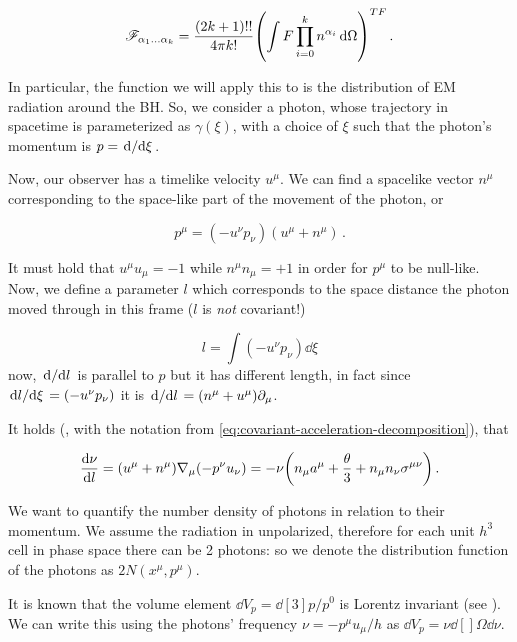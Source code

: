 \documentclass[main.tex]{subfiles}
\begin{document}
\begin{equation} \label{eq:PSTF-moments-function-decomposition}
    \mathscr F_{\alpha_1 \dots \alpha_k} =
    \frac{(2k+1)!!}{4 \pi k!} \qty(\int F \prod_{i=0}^k n^{\alpha_i}  \dd{\Omega}  )^{TF} \,.
\end{equation}

In particular, the function we will apply this to is the distribution of EM radiation around the BH. So, we consider a photon, whose trajectory in spacetime is parameterized as \(\gamma(\xi)\), with a choice of \(\xi\) such that the photon's momentum is
\(
p = \dv*{}{\xi}
\).

Now, our observer has a timelike velocity \(u^\mu\). We can find a spacelike vector \(n^\mu\) corresponding to the space-like part of the movement of the photon, or

\begin{equation}
  p^\mu = (- u^\nu p_\nu) (u^\mu + n^\mu)\,.
\end{equation}

It must hold that \(u^\mu u_\mu = -1 \) while \(n^\mu n_\mu = +1 \) in order for \(p^\mu\) to be null-like.
Now, we define a parameter \(l\) which corresponds to the space distance the photon moved through in this frame (\(l\)  is \emph{not} covariant!)

\begin{equation}
    l = \int  (-u^\nu p_\nu) \dd{\xi}
\end{equation}
now, \(\dv*{}{l} \) is parallel to \(p\) but it has different length, in fact since \(\dv*{l}{\xi} = (-u^\nu p_\nu) \) it is \(\dv*{}{l} = (n^\mu + u^\mu) \partial_\mu\).

It holds (\cite[eq. 2.17]{Thorne:1981feb}, with the notation from \eqref{eq:covariant-acceleration-decomposition}), that

\begin{equation}
  \dv{\nu}{l}  = (u^\mu + n^\mu) \nabla_\mu (-p^\nu u_\nu) = - \nu \qty(n_\mu a^\mu  + \frac{\theta}{3} + n_\mu n_\nu \sigma^{\mu\nu})\,.
\end{equation}

We want to quantify the number density of photons in relation to their momentum. We assume the radiation in unpolarized, therefore for each unit \(h^3\) cell in phase space there can be 2 photons: so we denote the distribution function of the photons as \(2N (x^\mu, p^\mu)\).

It is known that the volume element \(\dd{V}_p = \dd[3]{p} / p^0 \) is Lorentz invariant (see \cite[box 22.5]{MisnerThorneWheeler:1973}).
We can write this using the photons' frequency \(\nu = - p^\mu u_\mu / h\) as \(\dd{V}_p = \nu \dd[]{\Omega} \dd{\nu} \).
\end{document}
